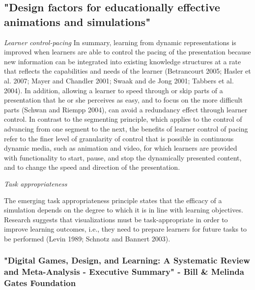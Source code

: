 \subsection{"Design factors for educationally effective animations and simulations"}

\textit{Learner control-pacing}
In summary, learning from dynamic representations is improved when learners are able to control the pacing of the presentation because new information can be integrated into existing knowledge structures at a rate that reflects the capabilities and needs of the learner (Betrancourt 2005; Hasler et al. 2007; Mayer and Chandler 2001; Swaak and de Jong 2001; Tabbers et al. 2004). In addition, allowing a learner to speed through or skip parts of a presentation that he or she perceives as easy, and to focus on the more difficult parts (Schwan and Riempp 2004), can avoid a redundancy effect through learner control. In contrast to the segmenting principle, which applies to the control of advancing from one segment to the next, the benefits of learner control of pacing refer to the finer level of granularity of control that is possible in continuous dynamic media, such as animation and video, for which learners are provided with functionality to start, pause, and stop the dynamically presented content, and to change the speed and direction of the presentation.

\textit{Task appropriateness}

The emerging task appropriateness principle states that the efficacy of a simulation depends on the degree to which it is in line with learning objectives. Research suggests that visualizations must be task-appropriate in order to improve learning outcomes, i.e., they need to prepare learners for future tasks to be performed (Levin 1989; Schnotz and Bannert 2003).

\subsubsection{"Digital Games, Design, and Learning: A Systematic Review and Meta-Analysis - Executive Summary" - Bill \& Melinda Gates Foundation}

